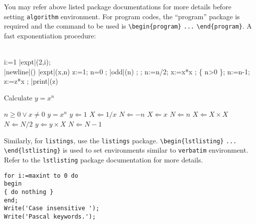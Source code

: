 \documentclass[sn-standardnature]{sn-jnl}%
\theoremstyle{thmstyleone}%
\theoremstyle{thmstyletwo}%
\theoremstyle{thmstylethree}%
\begin{document}
You may refer above listed package documentations for more details before setting \verb+algorithm+ environment. For program codes, the ``program'' package is required and the command to be used is \verb+\begin{program}+ \verb+...+ \verb+\end{program}+. A fast exponentiation procedure:

\begin{program}
\BEGIN \\ %
  \FOR i:=1   \DO
     |expt|(2,i); \\ |newline|() \OD %
\WHERE
\PROC |expt|(x,n) \BODY
          z:=1;
          \DO \IF n=0 \THEN \EXIT \FI;
             \DO \IF |odd|(n) \THEN \EXIT \FI;
;
                n:=n/2; x:=x*x \OD;
             \{ n>0 \};
             n:=n-1; z:=z*x \OD;
          |print|(z) \ENDPROC
\END
\end{program}


\begin{algorithm}
\caption{Calculate $y = x^n$}\label{algo1}
\begin{algorithmic}[1]
\Require $n \geq 0 \vee x \neq 0$
\Ensure $y = x^n$
\State $y \Leftarrow 1$
\label{algln2}
        \State $X \Leftarrow 1 / x$
        \State $N \Leftarrow -n$
\Else
        \State $X \Leftarrow x$
        \State $N \Leftarrow n$
\EndIf
{}
            \State $X \Leftarrow X \times X$
            \State $N \Leftarrow N / 2$
        \Else[$N$ is odd]
            \State $y \Leftarrow y \times X$
            \State $N \Leftarrow N - 1$
        \EndIf
\EndWhile
\end{algorithmic}
\end{algorithm}
\bigskip

Similarly, for \verb+listings+, use the \verb+listings+ package. \verb+\begin{lstlisting}+ \verb+...+ \verb+\end{lstlisting}+ is used to set environments similar to \verb+verbatim+ environment. Refer to the \verb+lstlisting+ package documentation for more details.

\bigskip
\begin{minipage}{\hsize}%
\lstset{frame=single,framexleftmargin=-1pt,framexrightmargin=-17pt,framesep=12pt,linewidth=0.98\textwidth,language=pascal}%
\begin{lstlisting}
for i:=maxint to 0 do
begin
{ do nothing }
end;
Write('Case insensitive ');
Write('Pascal keywords.');
\end{lstlisting}
\end{minipage}
\end{document}
